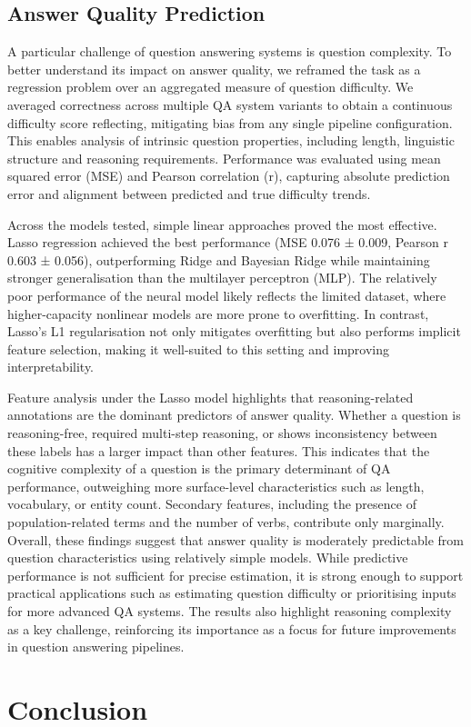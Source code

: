 \documentclass[11pt]{article}
\begin{document}
\subsection{Answer Quality Prediction}
A particular challenge of question answering systems is question complexity. To better understand its impact on answer quality, we reframed the task as a regression problem over an aggregated measure of question difficulty. We averaged correctness across multiple QA system variants to obtain a continuous difficulty score reflecting, mitigating bias from any single pipeline configuration. This enables analysis of intrinsic question properties, including length, linguistic structure and reasoning requirements. Performance was evaluated using mean squared error (MSE) and Pearson correlation (r), capturing absolute prediction error and alignment between predicted and true difficulty trends. \par
Across the models tested, simple linear approaches proved the most effective. Lasso regression achieved the best performance (MSE 0.076 ± 0.009, Pearson r 0.603 ± 0.056), outperforming Ridge and Bayesian Ridge while maintaining stronger generalisation than the multilayer perceptron (MLP). The relatively poor performance of the neural model likely reflects the limited dataset, where higher-capacity nonlinear models are more prone to overfitting. In contrast, Lasso’s L1 regularisation not only mitigates overfitting but also performs implicit feature selection, making it well-suited to this setting and improving interpretability. \par
Feature analysis under the Lasso model highlights that reasoning-related annotations are the dominant predictors of answer quality. Whether a question is reasoning-free, required multi-step reasoning, or shows inconsistency between these labels has a larger impact than other features. This indicates that the cognitive complexity of a question is the primary determinant of QA performance, outweighing more surface-level characteristics such as length, vocabulary, or entity count. Secondary features, including the presence of population-related terms and the number of verbs, contribute only marginally. Overall, these findings suggest that answer quality is moderately predictable from question characteristics using relatively simple models. While predictive performance is not sufficient for precise estimation, it is strong enough to support practical applications such as estimating question difficulty or prioritising inputs for more advanced QA systems. The results also highlight reasoning complexity as a key challenge, reinforcing its importance as a focus for future improvements in question answering pipelines. \par


\section{Conclusion}

\clearpage
\onecolumn


\clearpage

\end{document}
